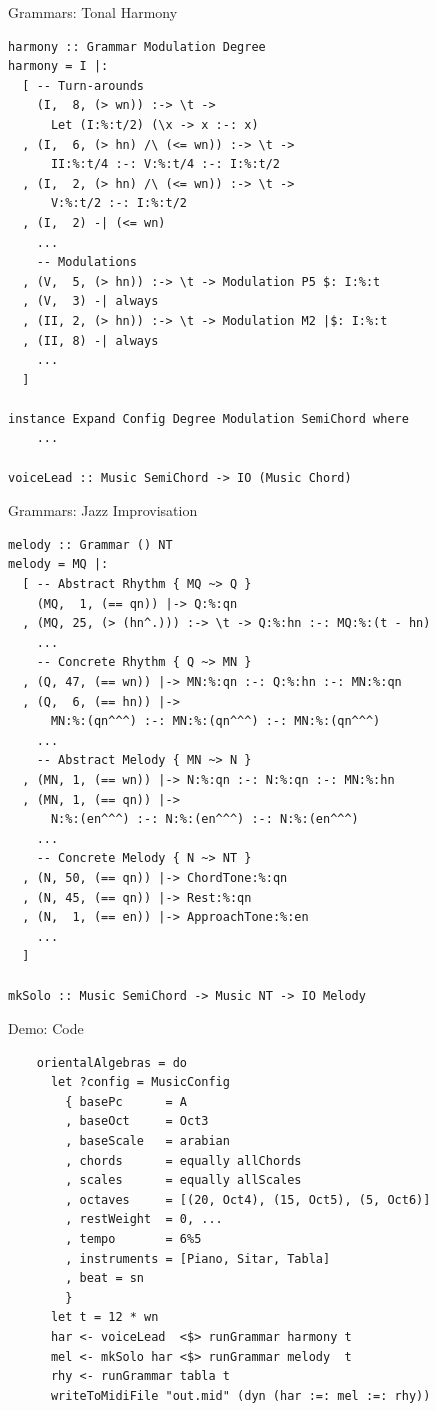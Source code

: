\documentclass{beamer}
\begin{document}
	\begin{frame}[fragile=singleslide]{Grammars: Tonal Harmony}
	\begin{verbatim}
harmony :: Grammar Modulation Degree
harmony = I |:
  [ -- Turn-arounds
    (I,  8, (> wn)) :-> \t ->
      Let (I:%:t/2) (\x -> x :-: x)
  , (I,  6, (> hn) /\ (<= wn)) :-> \t ->
      II:%:t/4 :-: V:%:t/4 :-: I:%:t/2
  , (I,  2, (> hn) /\ (<= wn)) :-> \t ->
      V:%:t/2 :-: I:%:t/2
  , (I,  2) -| (<= wn)
    ...
    -- Modulations
  , (V,  5, (> hn)) :-> \t -> Modulation P5 $: I:%:t
  , (V,  3) -| always
  , (II, 2, (> hn)) :-> \t -> Modulation M2 |$: I:%:t
  , (II, 8) -| always
    ...
  ]

instance Expand Config Degree Modulation SemiChord where
    ...

voiceLead :: Music SemiChord -> IO (Music Chord)
	\end{verbatim}
	\end{frame}	
	
	\begin{frame}[fragile=singleslide]{Grammars: Jazz Improvisation}
	\begin{verbatim}
melody :: Grammar () NT
melody = MQ |:
  [ -- Abstract Rhythm { MQ ~> Q }
    (MQ,  1, (== qn)) |-> Q:%:qn
  , (MQ, 25, (> (hn^.))) :-> \t -> Q:%:hn :-: MQ:%:(t - hn)
    ...
    -- Concrete Rhythm { Q ~> MN }
  , (Q, 47, (== wn)) |-> MN:%:qn :-: Q:%:hn :-: MN:%:qn
  , (Q,  6, (== hn)) |->
      MN:%:(qn^^^) :-: MN:%:(qn^^^) :-: MN:%:(qn^^^)
    ...
    -- Abstract Melody { MN ~> N }
  , (MN, 1, (== wn)) |-> N:%:qn :-: N:%:qn :-: MN:%:hn
  , (MN, 1, (== qn)) |->
      N:%:(en^^^) :-: N:%:(en^^^) :-: N:%:(en^^^)
    ...
    -- Concrete Melody { N ~> NT }
  , (N, 50, (== qn)) |-> ChordTone:%:qn
  , (N, 45, (== qn)) |-> Rest:%:qn
  , (N,  1, (== en)) |-> ApproachTone:%:en
    ...
  ]

mkSolo :: Music SemiChord -> Music NT -> IO Melody
    \end{verbatim}
	\end{frame}
	
	\begin{frame}[fragile=singleslide]{Demo: Code}
	\begin{verbatim}
    orientalAlgebras = do
      let ?config = MusicConfig
        { basePc      = A
        , baseOct     = Oct3
        , baseScale   = arabian
        , chords      = equally allChords
        , scales      = equally allScales
        , octaves     = [(20, Oct4), (15, Oct5), (5, Oct6)]
        , restWeight  = 0, ...
        , tempo       = 6%5
        , instruments = [Piano, Sitar, Tabla]
        , beat = sn
        }
      let t = 12 * wn
      har <- voiceLead  <$> runGrammar harmony t
      mel <- mkSolo har <$> runGrammar melody  t
      rhy <- runGrammar tabla t
      writeToMidiFile "out.mid" (dyn (har :=: mel :=: rhy))
	\end{verbatim}
  	\end{frame}
\end{document}
